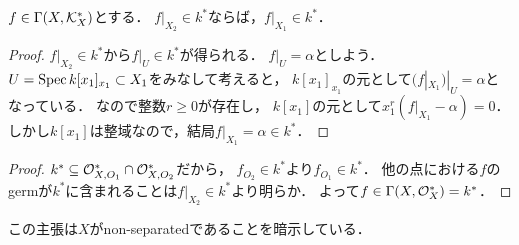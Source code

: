 \documentclass[a4paper]{jsarticle}
\begin{document}
    \begin{Claim}
        $f \in \Gamma(X, \mathcal{K}_X^*)$とする．
        $f|_{X_2} \in k^*$ならば，$f|_{X_1} \in k^*$．
    \end{Claim}
    \begin{proof}
        $f|_{X_2} \in k^*$から$f|_U \in k^*$が得られる．
        $f|_U=\alpha$としよう．
        $U=\operatorname{Spec} k[x_1]_{x_1} \subset X_1$をみなして考えると，
        $k[x_1]_{x_1}$の元として$(f|_{X_1})|_U=\alpha$となっている．
        なので整数$r \geq 0$が存在し，
        $k[x_1]$の元として$x_1^r(f|_{X_1}-\alpha)=0$．
        しかし$k[x_1]$は整域なので，結局$f|_{X_1}=\alpha \in k^*$．
    \end{proof}
    \begin{proof}
        $k^* \subseteq \mathcal{O}_{X, O_1}^* \cap \mathcal{O}_{X, O_2}^*$だから，
        $f_{O_2} \in k^*$より$f_{O_1} \in k^*$．
        他の点における$f$のgermが$k^*$に含まれることは$f|_{X_2} \in k^*$より明らか．
        よって$f \in \Gamma(X, \mathcal{O}_X^*)=k^*$．
    \end{proof}
    この主張は$X$がnon-separatedであることを暗示している．
\end{document}
